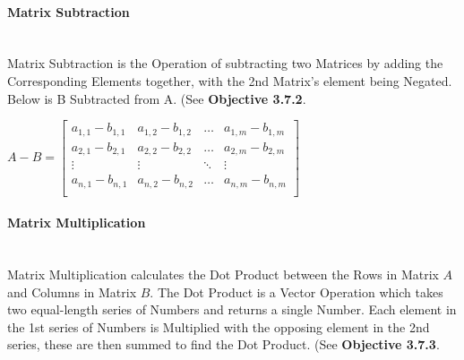 \begin{flushleft}
                \paragraph{Matrix Subtraction} \mbox{} \\
                    \vspace{0.2cm}
                    Matrix Subtraction is the Operation of subtracting two Matrices by adding the Corresponding Elements together, with the 2nd Matrix's element 
                    being Negated. Below is B Subtracted from A. (See \textbf{Objective 3.7.2}.\\

                    \begin{center}
                        $
                        A - B =
                        \begin{bmatrix}
                            a_{1,1} - b_{1,1} & a_{1,2} - b_{1,2} & \hdots  & a_{1,m} - b_{1,m} \\
                            a_{2,1} - b_{2,1} & a_{2,2} - b_{2,2} & \hdots  & a_{2,m} - b_{2,m} \\
                            \vdots            & \vdots            & \ddots  & \vdots            \\
                            a_{n,1} - b_{n,1} & a_{n,2} - b_{n,2} & \hdots  & a_{n,m} - b_{n,m} \\
                        \end{bmatrix}
                        $
                    \end{center}

                \paragraph{Matrix Multiplication} \mbox{} \\
                    \vspace{0.2cm}
                    Matrix Multiplication calculates the Dot Product between the Rows in Matrix $A$ and Columns in Matrix $B$. The Dot Product is a Vector Operation
                    which takes two equal-length series of Numbers and returns a single Number. Each element in the 1st series of Numbers is Multiplied with the opposing element
                    in the 2nd series, these are then summed to find the Dot Product. (See \textbf{Objective 3.7.3}.\\


\end{flushleft}
